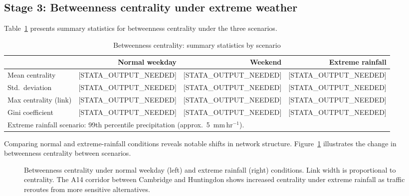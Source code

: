 \documentclass[review]{elsarticle}
\begin{document}
\subsection{Stage 3: Betweenness centrality under extreme weather}
\label{sec:results:centrality}

Table~\ref{tab:centrality} presents summary statistics for betweenness centrality under the three scenarios.

\begin{table}[htbp]
\centering
\caption{Betweenness centrality: summary statistics by scenario}
\label{tab:centrality}
\begin{tabular}{lrrr}
\toprule
 & Normal weekday & Weekend & Extreme rainfall \\
\midrule
Mean centrality & [STATA\_OUTPUT\_NEEDED] & [STATA\_OUTPUT\_NEEDED] & [STATA\_OUTPUT\_NEEDED] \\
Std.\ deviation & [STATA\_OUTPUT\_NEEDED] & [STATA\_OUTPUT\_NEEDED] & [STATA\_OUTPUT\_NEEDED] \\
Max centrality (link) & [STATA\_OUTPUT\_NEEDED] & [STATA\_OUTPUT\_NEEDED] & [STATA\_OUTPUT\_NEEDED] \\
Gini coefficient & [STATA\_OUTPUT\_NEEDED] & [STATA\_OUTPUT\_NEEDED] & [STATA\_OUTPUT\_NEEDED] \\
\bottomrule
\multicolumn{4}{l}{\footnotesize Extreme rainfall scenario: 99th percentile precipitation (approx.\ 5~mm\,hr$^{-1}$).} \\
\end{tabular}
\end{table}

Comparing normal and extreme-rainfall conditions reveals notable shifts in network structure. Figure~\ref{fig:centrality} illustrates the change in betweenness centrality between scenarios.

\begin{figure}[htbp]
\centering
\caption{Betweenness centrality under normal weekday (left) and extreme rainfall (right) conditions. Link width is proportional to centrality. The A14 corridor between Cambridge and Huntingdon shows increased centrality under extreme rainfall as traffic reroutes from more sensitive alternatives.}
\label{fig:centrality}
\end{figure}
\end{document}
